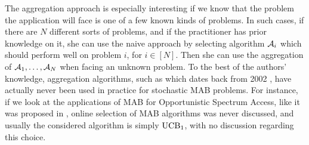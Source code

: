 

The aggregation approach is especially interesting if we know that the problem the application will face is one of a few known kinds of problems.
In such cases, if there are $N$ different sorts of problems, and if the practitioner has prior knowledge on it, she can use the naive approach by selecting algorithm $\mathcal{A}_i$ which should perform well on problem $i$, for $i\in[N]$.
Then she can use the aggregation of $\mathcal{A}_1,\dots,\mathcal{A}_N$ when facing an unknown problem.
%
%
To the best of the authors' knowledge, aggregation algorithms, such as \ExpQ{} which dates back from 2002 \cite{Auer02},
have actually never been used in practice for stochastic MAB problems.
%
For instance, if we look at the applications of MAB for Opportunistic Spectrum Access, like it was proposed in \cite{Jouini09,Jouini10,Jouini12},
online selection of MAB algorithms was never discussed,
and usually the considered algorithm is simply $\mathrm{UCB}_1$, with no discussion regarding this choice.




